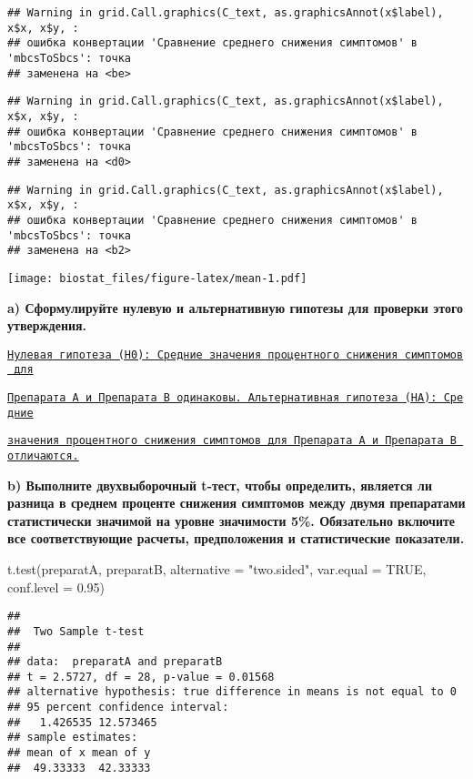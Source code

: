 \documentclass[
]{article}
\newenvironment{Shaded}{\begin{snugshade}}{\end{snugshade}}
\newcommand{\AttributeTok}[1]{\textcolor[rgb]{0.77,0.63,0.00}{#1}}
\newcommand{\ConstantTok}[1]{\textcolor[rgb]{0.00,0.00,0.00}{#1}}
\newcommand{\FloatTok}[1]{\textcolor[rgb]{0.00,0.00,0.81}{#1}}
\newcommand{\FunctionTok}[1]{\textcolor[rgb]{0.00,0.00,0.00}{#1}}
\newcommand{\NormalTok}[1]{#1}
\newcommand{\StringTok}[1]{\textcolor[rgb]{0.31,0.60,0.02}{#1}}
\begin{document}
\begin{verbatim}
## Warning in grid.Call.graphics(C_text, as.graphicsAnnot(x$label), x$x, x$y, :
## ошибка конвертации 'Сравнение среднего снижения симптомов' в 'mbcsToSbcs': точка
## заменена на <be>
\end{verbatim}

\begin{verbatim}
## Warning in grid.Call.graphics(C_text, as.graphicsAnnot(x$label), x$x, x$y, :
## ошибка конвертации 'Сравнение среднего снижения симптомов' в 'mbcsToSbcs': точка
## заменена на <d0>
\end{verbatim}

\begin{verbatim}
## Warning in grid.Call.graphics(C_text, as.graphicsAnnot(x$label), x$x, x$y, :
## ошибка конвертации 'Сравнение среднего снижения симптомов' в 'mbcsToSbcs': точка
## заменена на <b2>
\end{verbatim}

\texttt{[image: biostat\_files/figure-latex/mean-1.pdf]}

\textbf{a) Сформулируйте нулевую и альтернативную гипотезы для проверки
этого утверждения.}

\uline{\texttt{Нулевая\ гипотеза\ (H0):\ Средние\ значения\ процентного\ снижения\ симптомов\ для}}

\uline{\texttt{Препарата\ A\ и\ Препарата\ B\ одинаковы.\ Альтернативная\ гипотеза\ (HA):\ Средние}}

\uline{\texttt{значения\ процентного\ снижения\ симптомов\ для\ Препарата\ A\ и\ Препарата\ B\ отличаются.}}

\textbf{b) Выполните двухвыборочный t-тест, чтобы определить, является
ли разница в среднем проценте снижения симптомов между двумя препаратами
статистически значимой на уровне значимости 5\%. Обязательно включите
все соответствующие расчеты, предположения и статистические показатели.}

\begin{Shaded}
\begin{Highlighting}[]
\FunctionTok{t.test}\NormalTok{(preparatA, preparatB, }\AttributeTok{alternative =} \StringTok{"two.sided"}\NormalTok{, }\AttributeTok{var.equal =} \ConstantTok{TRUE}\NormalTok{, }\AttributeTok{conf.level =} \FloatTok{0.95}\NormalTok{)}
\end{Highlighting}
\end{Shaded}

\begin{verbatim}
## 
##  Two Sample t-test
## 
## data:  preparatA and preparatB
## t = 2.5727, df = 28, p-value = 0.01568
## alternative hypothesis: true difference in means is not equal to 0
## 95 percent confidence interval:
##   1.426535 12.573465
## sample estimates:
## mean of x mean of y 
##  49.33333  42.33333
\end{verbatim}
\end{document}
